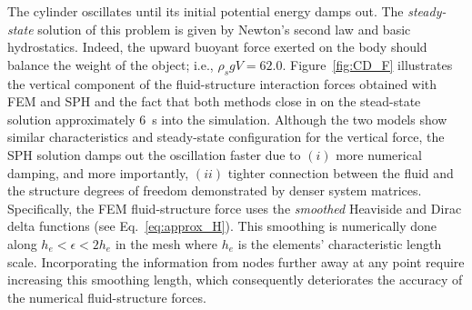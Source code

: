 \documentclass[final,3p,times]{elsarticle}
\begin{document}
The cylinder oscillates until its initial potential energy damps out. The {\textit{steady-state}} solution of this problem is given by Newton's second law and basic hydrostatics. Indeed, the upward buoyant force exerted on the body should balance the weight of the object; i.e., $\rho_s g V =62.0$. Figure~\ref{fig:CD_F} illustrates the vertical component of the fluid-structure interaction forces obtained with FEM and SPH and the fact that both methods close in on the stead-state solution approximately \SI{6}{s} into the simulation. Although the two models show similar characteristics and steady-state configuration for the vertical force, the SPH solution damps out the oscillation faster due to $(i)$ more numerical damping, and more importantly, $(ii)$ tighter connection between the fluid and the structure degrees of freedom demonstrated by denser system matrices. Specifically, the FEM fluid-structure force uses the \textit{smoothed} Heaviside and Dirac delta functions (see Eq.~\eqref{eq:approx_H}). This smoothing is numerically done along $h_e<\epsilon<2h_e$ in the mesh where $h_e$ is the elements' characteristic length scale. Incorporating the information from nodes further away at any point require increasing this smoothing length, which consequently deteriorates the accuracy of the numerical fluid-structure forces.
\end{document}
